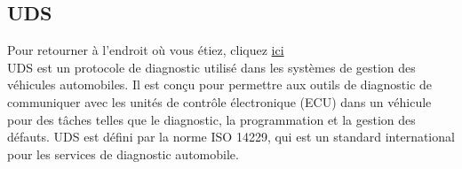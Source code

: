 \documentclass[a4paper, 12pt]{report}
\begin{document}
    



\subsection{UDS}\label{subsec:uds}
Pour retourner à l'endroit où vous étiez, cliquez \hyperref[sec:bilanPerso]{ici}\\

\ac{UDS} est un protocole de diagnostic utilisé dans les systèmes de gestion des véhicules automobiles. Il est conçu pour permettre aux outils de diagnostic de communiquer avec les unités de contrôle électronique (ECU) dans un véhicule pour des tâches telles que le diagnostic, la programmation et la gestion des défauts. UDS est défini par la norme ISO 14229, qui est un standard international pour les services de diagnostic automobile\cite{wiki_uds}.
\end{document}
